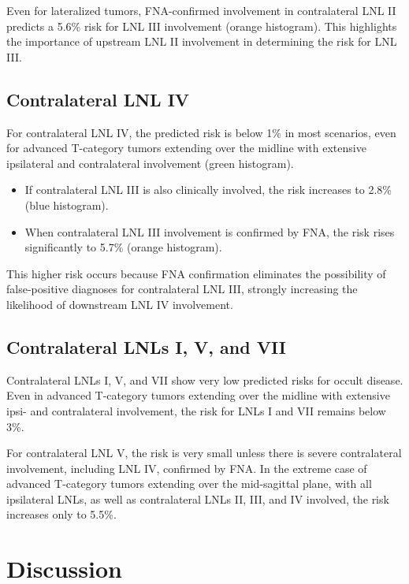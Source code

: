 \documentclass[
  sn-mathphys-num,
]{sn-jnl}
\providecommand{\tightlist}{%
  \setlength{\itemsep}{0pt}\setlength{\parskip}{0pt}}\usepackage{longtable,booktabs,array}
\begin{document}
Even for lateralized tumors, FNA-confirmed involvement in contralateral
LNL II predicts a 5.6\% risk for LNL III involvement (orange histogram).
This highlights the importance of upstream LNL II involvement in
determining the risk for LNL III.

\subsection{Contralateral LNL IV}\label{contralateral-lnl-iv}

For contralateral LNL IV, the predicted risk is below 1\% in most
scenarios, even for advanced T-category tumors extending over the
midline with extensive ipsilateral and contralateral involvement (green
histogram).

\begin{itemize}
\tightlist
\item
  If contralateral LNL III is also clinically involved, the risk
  increases to 2.8\% (blue histogram).\\
\item
  When contralateral LNL III involvement is confirmed by FNA, the risk
  rises significantly to 5.7\% (orange histogram).
\end{itemize}

This higher risk occurs because FNA confirmation eliminates the
possibility of false-positive diagnoses for contralateral LNL III,
strongly increasing the likelihood of downstream LNL IV involvement.

\subsection{Contralateral LNLs I, V, and
VII}\label{contralateral-lnls-i-v-and-vii}

Contralateral LNLs I, V, and VII show very low predicted risks for
occult disease. Even in advanced T-category tumors extending over the
midline with extensive ipsi- and contralateral involvement, the risk for
LNLs I and VII remains below 3\%.

For contralateral LNL V, the risk is very small unless there is severe
contralateral involvement, including LNL IV, confirmed by FNA. In the
extreme case of advanced T-category tumors extending over the
mid-sagittal plane, with all ipsilateral LNLs, as well as contralateral
LNLs II, III, and IV involved, the risk increases only to 5.5\%.

\section{Discussion}\label{sec-discussion}
\end{document}
